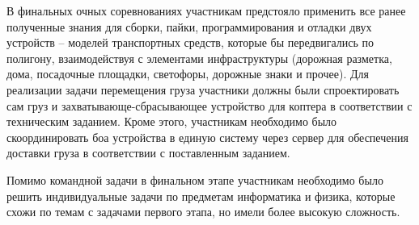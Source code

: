В финальных очных соревнованиях участникам предстояло применить все ранее полученные знания для сборки, пайки, программирования и отладки двух устройств – моделей транспортных средств, которые бы передвигались по полигону, взаимодействуя с элементами инфраструктуры (дорожная разметка, дома, посадочные площадки, светофоры, дорожные знаки и прочее). Для реализации задачи перемещения груза участники должны были спроектировать сам груз и захватывающе-сбрасывающее устройство для коптера в соответствии с техническим заданием. Кроме этого, участникам необходимо было скоординировать боа устройства в единую систему через сервер для обеспечения доставки груза в соответствии с поставленным заданием. 

Помимо командной задачи в финальном этапе участникам необходимо было решить индивидуальные задачи по предметам информатика и физика, которые схожи по темам с задачами первого этапа, но имели более высокую сложность.

\clearpage
\endgroup